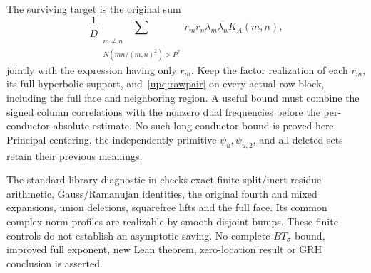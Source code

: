 The surviving target is the original sum
\[
 \frac1D\sum_{\substack{m\ne n\\N(mn/(m,n)^2)>P^2}}
 r_mr_n\lambda_m\overline{\lambda_n}K_A(m,n),
\]
jointly with the expression having only $r_m$.
Keep the factor realization of each $r_m$, its full hyperbolic support,
and~\eqref{upq:rawpair} on every actual row block, including the full
face and neighboring region. A useful bound must combine the signed
column correlations with the nonzero dual frequencies before the
per-conductor absolute estimate. No such long-conductor bound is
proved here. Principal centering, the independently primitive
$\psi_u,\psi_{u,2}$, and all deleted sets retain their previous meanings.

The standard-library diagnostic in
checks exact finite split/inert residue arithmetic, Gauss/Ramanujan
identities, the original fourth and mixed expansions, union deletions,
squarefree lifts and the full face. Its common complex norm profiles
are realizable by smooth disjoint bumps. These finite controls do not
establish an asymptotic saving. No complete $BT_\sigma$ bound, improved
full exponent, new Lean theorem, zero-location result or GRH conclusion
is asserted.
